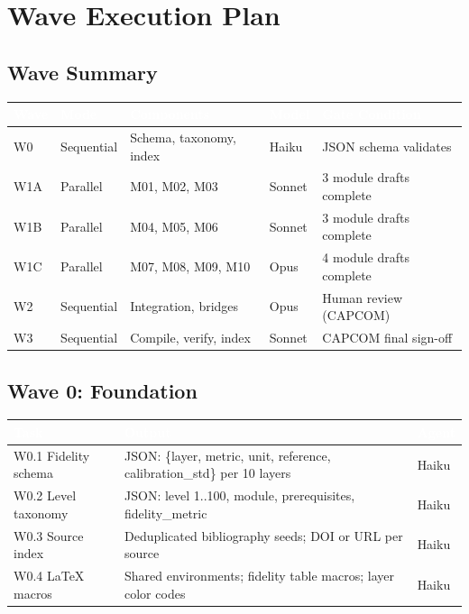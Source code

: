 \documentclass[11pt,letterpaper]{article}
\newcommand{\tableheader}[1]{\textbf{\sffamily\textcolor{white}{#1}}}
\begin{document}
\newpage

\section{Wave Execution Plan}

\subsection{Wave Summary}

\begin{center}
\begin{tabularx}{\textwidth}{L{1.6cm}L{1.8cm}L{3.5cm}L{1.8cm}X}
\toprule
{}
\tableheader{Wave} & \tableheader{Mode} & \tableheader{Components} & \tableheader{Model} & \tableheader{Gate Condition} \\
\midrule
W0 & Sequential & Schema, taxonomy, index & Haiku & JSON schema validates \\
W1A & Parallel & M01, M02, M03 & Sonnet & 3 module drafts complete \\
W1B & Parallel & M04, M05, M06 & Sonnet & 3 module drafts complete \\
W1C & Parallel & M07, M08, M09, M10 & Opus & 4 module drafts complete \\
W2 & Sequential & Integration, bridges & Opus & Human review (CAPCOM) \\
W3 & Sequential & Compile, verify, index & Sonnet & CAPCOM final sign-off \\
\bottomrule
\end{tabularx}
\end{center}

\subsection{Wave 0: Foundation}

\begin{center}
\begin{tabularx}{\textwidth}{L{2.8cm}XL{2cm}}
\toprule
{}
\tableheader{Task} & \tableheader{Output} & \tableheader{Agent} \\
\midrule
W0.1 Fidelity schema & JSON: \{layer, metric, unit, reference, calibration\_std\} per 10 layers & Haiku \\
W0.2 Level taxonomy & JSON: level 1..100, module, prerequisites, fidelity\_metric & Haiku \\
W0.3 Source index & Deduplicated bibliography seeds; DOI or URL per source & Haiku \\
W0.4 LaTeX macros & Shared environments; fidelity table macros; layer color codes & Haiku \\
\bottomrule
\end{tabularx}
\end{center}
\end{document}
